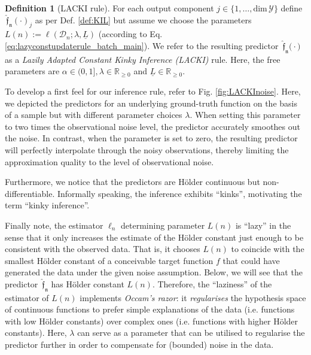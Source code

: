 \documentclass{article} %
\theoremstyle{definition}
\newtheorem{defn}[thm]{Definition}
\theoremstyle{remark}
\newcommand{\Real}{\mathbb R}
\newcommand{\data}{\ensuremath{ \mathcal D} }
\newcommand{\outspace}{\ensuremath{ \mathcal Y}}
\newcommand{\predfn}{\, \mathfrak{  \hat f_n}} %
\newcommand{\hexp}{{ \alpha }}%
\newcommand{\hestthresh}{\ensuremath{ \lambda}}
\begin{document}
\begin{defn}[LACKI rule] \label{def:LACKI} For each output component $j \in \{1,\ldots,\text{dim} \, \outspace \}$ 
define $\predfn(\cdot)_{j}$  as per Def. \ref{def:KIL} but assume we choose the parameters $L(n) := \ell(\data_n;\hestthresh,\underline L)$ (according to Eq. \ref{eq:lazyconstupdaterule_batch_main}). We refer to the resulting predictor $\predfn\bigl(\cdot \bigr)$ as a \emph{Lazily Adapted Constant Kinky Inference (LACKI)} rule. Here, the free parameters are $\hexp \in (0,1], \hestthresh \in \Real_{\geq 0}$ and $\underline L \in \Real_{\geq 0}$.  
\end{defn}

To develop a first feel for our inference rule, refer to Fig. \ref{fig:LACKInoise}. Here, we depicted the predictors for an underlying ground-truth function on the basis of a sample but with different parameter choices $\hestthresh$. When setting this parameter to two times the observational noise level, the predictor accurately smoothes out the noise. In contrast, when the parameter is set to zero, the resulting predictor will perfectly interpolate through the noisy observations, thereby limiting the approximation quality to the level of observational noise. 

Furthermore, we notice that the predictors are H\"older continuous but non-differentiable. Informally speaking, the inference exhibits ``kinks'', motivating the term ``kinky inference''.

Finally note, the estimator $\ell_n$ determining  parameter $L(n)$ is ``lazy'' in the sense that it only increases the estimate of the H\"older constant just enough to be consistent with the observed data. That is, it chooses $L(n)$ to coincide with the smallest H\"older constant of a conceivable target function $f$ that could have generated the data under the given noise assumption. Below, we will see that the predictor $\predfn$ has H\"older constant $L(n)$. Therefore, the ``laziness'' of the estimator of $L(n)$ implements \emph{Occam's razor}: it \emph{regularises} the hypothesis space of continuous functions to prefer simple explanations of the data (i.e. functions with low H\"older constants) over complex ones (i.e. functions with higher H\"older constants). Here, $\hestthresh$ can serve as a parameter that can be utilised to regularise the predictor further in order to compensate for (bounded) noise in the data. 
\end{document}

